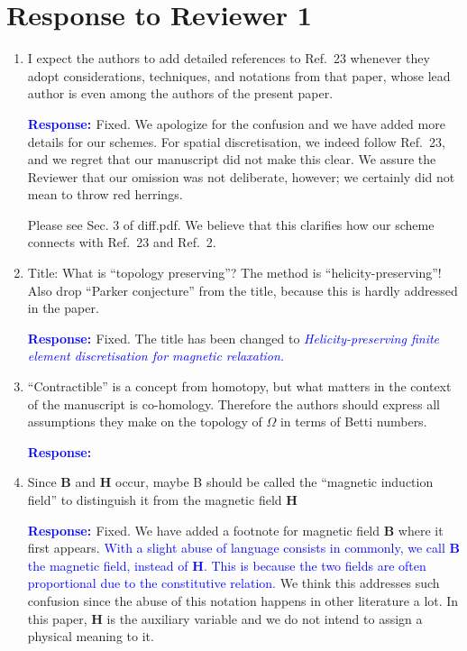 \documentclass{article}
\newcommand{\pef}[1]{\todo[color=blue!30,inline]{{\bf PEF:} #1}}
\theoremstyle{definition}
\newcommand{\rv}[1]{%
  \colorbox{gray!20}{%
    \parbox{0.96\linewidth}{%
      \small #1
    }%
  }%
}
\newcommand{\rp}{\textbf{\textcolor{blue}{Response: }}}
\newcommand{\blue}[1]{\textcolor{blue}{#1}}
\begin{document}
\section{Response to Reviewer 1}
\begin{enumerate}
    \item \rv{I expect the authors to add detailed references to
Ref.\ 23 whenever they adopt considerations, techniques, and notations from that paper,
whose lead author is even among the authors of the present paper.}

\rp Fixed. We apologize for the confusion and we have added more details for our schemes. For spatial discretisation, we indeed follow Ref.\ 23, and we regret that our manuscript did not make this clear. We assure the Reviewer that our omission was not deliberate, however; we certainly did not mean to throw red herrings. 

\begin{comment}
\pef{The text quoted here (and throughout the response) is out of sync with the main article. Please copy and paste \emph{all} text again once we have finalised our changes to the article.}
\end{comment}
Please see Sec. 3 of diff.pdf. We believe that this clarifies how our scheme connects with Ref.\ 23 and Ref.\ 2. 

    \item \rv{Title: What is “topology preserving”? The method is “helicity-preserving”! Also drop
“Parker conjecture” from the title, because this is hardly addressed in the paper.} 

\rp Fixed. The title has been changed to \blue{\textit{Helicity-preserving finite element discretisation for magnetic relaxation.}} 

    \item \rv{“Contractible” is a concept from homotopy, but what matters in the context of the manuscript is co-homology. Therefore the authors should express all assumptions they
make on the topology of $\Omega$ in terms of Betti numbers.}
 
\rp {} 

\item \rv{Since $\bm B$ and $\bm H$ occur, maybe B should be called the “magnetic induction field” to distinguish it from the magnetic field $\bm H$}

\rp Fixed. We have added a footnote for magnetic field $\bm B$ where it first appears. \blue{With a slight abuse of language consists in commonly, we call $\bm B$ the magnetic field, instead of $\bm H$. This is because the two fields are often proportional due to the constitutive relation.} We think this addresses such confusion since the abuse of this notation happens in other literature a lot. In this paper, $\bm H$ is the auxiliary variable and we do not intend to assign a physical meaning to it.


\end{enumerate}
\end{document}
